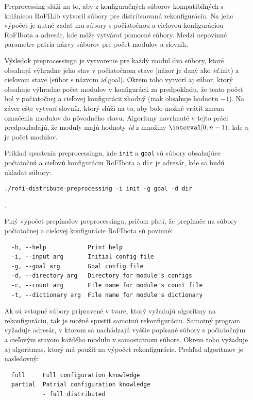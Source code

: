 \documentclass[
  digital, %
  oneside, %
  table,   %
  lof,     %
  nolot,     %
]{fithesis3}
\begin{document}
Preprocessing slúži na to, aby z konfiguračných súborov kompatibilných s knižnicou RoFILib vytvoril súbory pre distribuovanú rekonfiguráciu. Na jeho výpočet je nutné zadať mu súbory s počiatočnou a cieľovou konfiguráciou RoFIbota a adresár, kde môže vytvárať pomocné súbory. Medzi nepovinné parametre patria názvy súborov pre počet modulov a slovník. 

Výsledok preprocessingu je vytvorenie pre každý modul dva súbory, ktoré obsahujú výhradne jeho stav v počiatočnom stave (názor je daný ako \textit{id}.init) a cieľovom stave (súbor s názvom \textit{id}.goal). Okrem toho vytvorí aj súbor, ktorý obsahuje výhradne počet modulov v konfigurácii za predpokladu, že tento počet bol v počiatočnej a cieľovej konfigurácii zhodný (inak obsahuje hodnotu $-1$). Na záver ešte vytvorí slovník, ktorý slúži na to, aby bolo možné vrátiť zmenu označenia modulov do pôvodného stavu. Algoritmy navrhnuté v tejto práci predpokladajú, že moduly majú hodnoty \textit{id} z množiny $\interval[0, n - 1)$, kde $n$ je počet modulov. 

Príklad spustenia preprocessingu, kde \texttt{init} a \texttt{goal} sú súbory obsahujúce počiatočnú a cieľovú konfiguráciu RoFIbota a \texttt{dir} je adresár, kde sa budú ukladať súbory:

\begin{verbatim}
./rofi-distribute-preprocessing -i init -g goal -d dir
\end{verbatim}.

Plný výpočet prepínačov preprocessingu, pričom platí, že prepínače na súbory počiatočnej a cieľovej konfigurácie RoFIbota sú povinné: 
\begin{verbatim}
  -h, --help            Print help
  -i, --input arg       Initial config file
  -g, --goal arg        Goal config file
  -d, --directory arg   Directory for module's configs
  -c, --count arg       File name for module's count file
  -t, --dictionary arg  File name for module's dictionary
\end{verbatim}

Ak sú vstupné súbory pripravené v tvare, ktorý vyžadujú algoritmy na rekonfiguráciu, tak je možné spustiť samotnú rekonfiguráciu. Samotný program vyžaduje adresár, v ktorom sa nachádzajú vyššie popísané súbory s počiatočným a cieľovým stavom každého modulu v samostatnom súbore. Okrem toho vyžaduje aj algoritmus, ktorý má použiť na výpočet rekonfigurácie. Prehľad algoritmov je nasledovný: 

\begin{verbatim}
  full     Full configuration knowledge
  partial  Patrial configuration knowledge 
           - full distributed
\end{verbatim}
\end{document}
